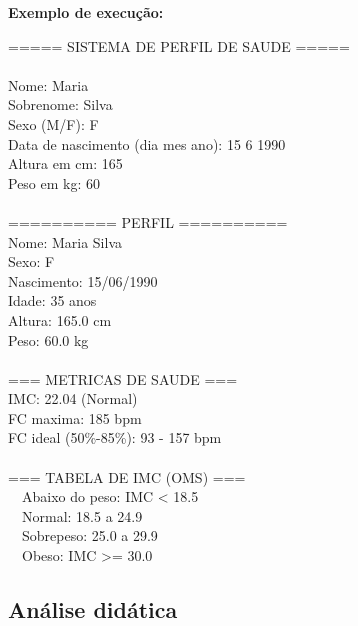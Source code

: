 \documentclass[12pt,a4paper]{article}
\begin{document}
\begin{respostabox}
\textbf{Exemplo de execução:}
\begin{saida}
===== SISTEMA DE PERFIL DE SAUDE =====\\
\\
Nome: Maria\\
Sobrenome: Silva\\
Sexo (M/F): F\\
Data de nascimento (dia mes ano): 15 6 1990\\
Altura em cm: 165\\
Peso em kg: 60\\
\\
========== PERFIL ==========\\
Nome:           Maria Silva\\
Sexo:           F\\
Nascimento:     15/06/1990\\
Idade:          35 anos\\
Altura:         165.0 cm\\
Peso:           60.0 kg\\
\\
=== METRICAS DE SAUDE ===\\
IMC:                  22.04 (Normal)\\
FC maxima:            185 bpm\\
FC ideal (50\%-85\%):  93 - 157 bpm\\
\\
=== TABELA DE IMC (OMS) ===\\
\ \ Abaixo do peso:  IMC < 18.5\\
\ \ Normal:          18.5 a 24.9\\
\ \ Sobrepeso:       25.0 a 29.9\\
\ \ Obeso:           IMC >= 30.0
\end{saida}
\end{respostabox}

\subsection*{Análise didática}
\end{document}
